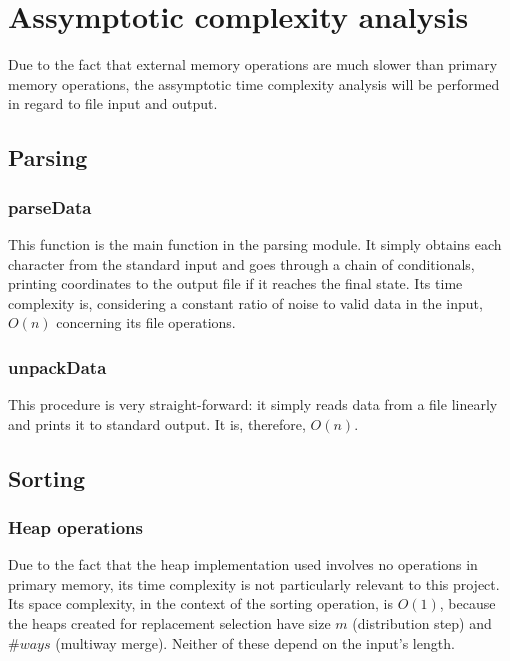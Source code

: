 \documentclass[10pt,a4paper]{article}
\begin{document}
\section*{Assymptotic complexity analysis}

Due to the fact that external memory operations are much slower than primary memory operations, the assymptotic time complexity analysis will be performed in regard to file input and output.

\subsection*{Parsing}

\subsubsection*{parseData}

This function is the main function in the parsing module. It simply obtains each character from the standard input and goes through a chain of conditionals, printing coordinates to the output file if it reaches the final state. Its time complexity is, considering a constant ratio of noise to valid data in the input, $O(n)$ concerning its file operations.

\subsubsection*{unpackData}

This procedure is very straight-forward: it simply reads data from a file linearly and prints it to standard output. It is, therefore, $O(n)$.

\subsection*{Sorting}

\subsubsection*{Heap operations}

Due to the fact that the heap implementation used involves no operations in primary memory, its time complexity is not particularly relevant to this project. Its space complexity, in the context of the sorting operation, is $O(1)$, because the heaps created for replacement selection have size $m$ (distribution step) and $\#ways$ (multiway merge). Neither of these depend on the input's length.
\end{document}
